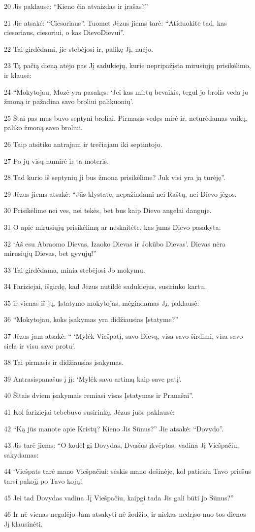 \par 20 Jis paklausė: “Kieno čia atvaizdas ir įrašas?” 
\par 21 Jie atsakė: “Ciesoriaus”. Tuomet Jėzus jiems tarė: “Atiduokite tad, kas ciesoriaus, ciesoriui, o kas Dievo­Dievui”. 
\par 22 Tai girdėdami, jie stebėjosi ir, palikę Jį, nuėjo. 
\par 23 Tą pačią dieną atėjo pas Jį sadukiejų, kurie nepripažįsta mirusiųjų prisikėlimo, ir klausė: 
\par 24 “Mokytojau, Mozė yra pasakęs: ‘Jei kas mirtų bevaikis, tegul jo brolis veda jo žmoną ir pažadina savo broliui palikuonių’. 
\par 25 Štai pas mus buvo septyni broliai. Pirmasis vedęs mirė ir, neturėdamas vaikų, paliko žmoną savo broliui. 
\par 26 Taip atsitiko antrajam ir trečiajam iki septintojo. 
\par 27 Po jų visų numirė ir ta moteris. 
\par 28 Tad kurio iš septynių ji bus žmona prisikėlime? Juk visi yra ją turėję”. 
\par 29 Jėzus jiems atsakė: “Jūs klystate, nepažindami nei Raštų, nei Dievo jėgos. 
\par 30 Prisikėlime nei ves, nei tekės, bet bus kaip Dievo angelai danguje. 
\par 31 O apie mirusiųjų prisikėlimą ar neskaitėte, kas jums Dievo pasakyta: 
\par 32 ‘Aš esu Abraomo Dievas, Izaoko Dievas ir Jokūbo Dievas’. Dievas nėra mirusiųjų Dievas, bet gyvųjų!” 
\par 33 Tai girdėdama, minia stebėjosi Jo mokymu. 
\par 34 Fariziejai, išgirdę, kad Jėzus nutildė sadukiejus, susirinko kartu, 
\par 35 ir vienas iš jų, Įstatymo mokytojas, mėgindamas Jį, paklausė: 
\par 36 “Mokytojau, koks įsakymas yra didžiausias Įstatyme?” 
\par 37 Jėzus jam atsakė: “ ‘Mylėk Viešpatį, savo Dievą, visa savo širdimi, visa savo siela ir visu savo protu’. 
\par 38 Tai pirmasis ir didžiausias įsakymas. 
\par 39 Antrasis­panašus į jį: ‘Mylėk savo artimą kaip save patį’. 
\par 40 Šitais dviem įsakymais remiasi visas Įstatymas ir Pranašai”. 
\par 41 Kol fariziejai tebebuvo susirinkę, Jėzus juos paklausė: 
\par 42 “Ką jūs manote apie Kristų? Kieno Jis Sūnus?” Jie atsakė: “Dovydo”. 
\par 43 Jis tarė jiems: “O kodėl gi Dovydas, Dvasios įkvėptas, vadina Jį Viešpačiu, sakydamas: 
\par 44 ‘Viešpats tarė mano Viešpačiui: sėskis mano dešinėje, kol patiesiu Tavo priešus tarsi pakojį po Tavo kojų’. 
\par 45 Jei tad Dovydas vadina Jį Viešpačiu, kaipgi tada Jis gali būti jo Sūnus?” 
\par 46 Ir nė vienas negalėjo Jam atsakyti nė žodžio, ir niekas nedrįso nuo tos dienos Jį klausinėti.



